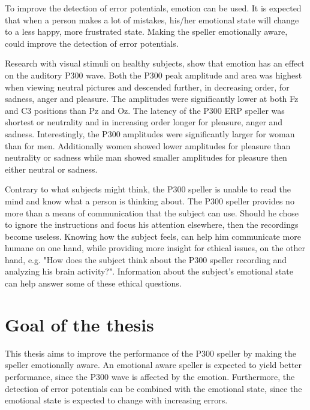 \npar

To improve the detection of error potentials, emotion can be used. It is expected that when a person makes a lot of mistakes, his/her emotional state will change to a less happy, more frustrated state. Making the speller emotionally aware, could improve the detection of error potentials.

\npar

Research with visual stimuli on healthy subjects, show that emotion has an effect on the auditory P300 wave\cite{AuditoryP300Effect}. Both the P300 peak amplitude and area was highest when viewing neutral pictures and descended further, in decreasing order, for sadness, anger and pleasure. The amplitudes were significantly lower at both Fz and C3 positions than Pz and Oz. The latency of the P300 ERP speller was shortest or neutrality and in increasing order longer for pleasure, anger and sadness. Interestingly, the P300 amplitudes were significantly larger for woman than for men. Additionally women showed lower amplitudes for pleasure than neutrality or sadness while man showed smaller amplitudes for pleasure then either neutral or sadness. 

\npar

Contrary to what subjects might think, the P300 speller is unable to read the mind and know what a person is thinking about\cite{P300Origin}. The P300 speller provides no more than a means of communication that the subject can use. Should he chose to ignore the instructions and focus his attention elsewhere, then the recordings become useless. Knowing how the subject feels, can help him communicate more humane on one hand, while providing more insight for ethical issues, on the other hand, e.g. "How does the subject think about the P300 speller recording and analyzing his brain activity?". Information about the subject's emotional state can help answer some of these ethical questions.

\clearpage

\section{Goal of the thesis}

This thesis aims to improve the performance of the P300 speller by making the speller emotionally aware. An emotional aware speller is expected to yield better performance, since the P300 wave is affected by the emotion. Furthermore, the detection of error potentials can be combined with the emotional state, since the emotional state is expected to change with increasing errors.

